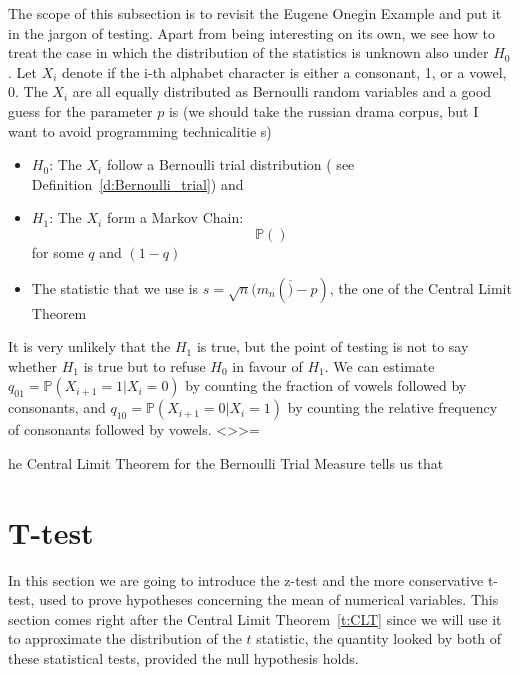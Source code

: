       	The scope of this subsection is to revisit the Eugene Onegin Example and put it in the jargon of testing. Apart from being interesting on its own, we see how to treat the case in which the distribution of the statistics is unknown also under $H_0$. Let $X_i$ denote if the i-th alphabet character is either a consonant, 1,  or a vowel, 0. The $X_i$ are all equally distributed as Bernoulli random variables and a good guess for the parameter $p$ is (we should take the russian drama corpus, but I want to avoid programming technicalitie s)
	\begin{itemize}
      		\item $H_0$: The $X_i$ follow a Bernoulli trial distribution ( see Definition~\ref{d:Bernoulli_trial}) and 
      		\item $H_1$: The $X_i$ form a Markov Chain: 
      			\begin{equation}
      				\label{}
      				\mathbb P()
      			\end{equation}
      			for some $q$ and $(1-q)$
      		\item The statistic that we use is $ s = \sqrt{n } ( m_n(\overline  ) - p)$, the one of the Central Limit Theorem 
      	\end{itemize}
      	It is very unlikely that the $H_1$ is true, but the point of testing is not to say whether $H_1$ is true but to refuse $H_0$ in favour of $H_1$. We can estimate $q_{01} =\mathbb P( X_{i+1} = 1 | X_i = 0)$ by counting the fraction of vowels followed by consonants, and  $q_{10} = \mathbb P( X_{i+1 } = 0 | X_i = 1)$ by counting the relative frequency of consonants followed by vowels.
<>>=



he Central Limit Theorem for the Bernoulli Trial Measure tells us that 
      \begin{equation}
      	\label{e:}
      \end{equation}
	

	\section{T-test} 
      	
	In this section we are going to introduce the z-test and the more conservative t-test, used to prove hypotheses concerning the mean of numerical variables. This section comes right after the Central Limit Theorem~\ref{t:CLT} since we will use it to approximate the distribution of the $t$ statistic, the quantity looked by both of these statistical tests, provided the null hypothesis holds. 

